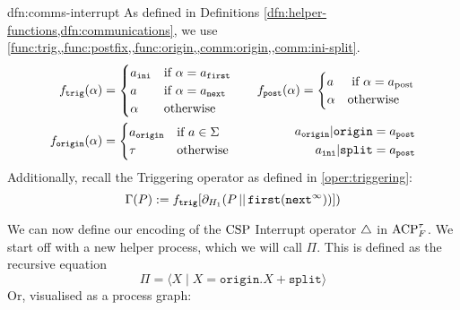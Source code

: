 \documentclass[../hons_project.tex]{subfiles}
\begin{document}
\begin{dfn}{dfn:comms-interrupt}{}
	As defined in Definitions \cref{dfn:helper-functions,dfn:communications}, we use \cref{func:trig,,func:postfix,,func:origin,,comm:origin,,comm:ini-split}.
	\begin{align*}
		f_{\mathtt{trig}}(\alpha) & = \begin{cases}
			                              a_{\mathtt{ini}} & \text{if } \alpha = a_{\mathtt{first}} \\
			                              a                & \text{if } \alpha = a_{\mathtt{next}}  \\
			                              \alpha           & \text{otherwise}
		                              \end{cases} \quad
		                          & f_{\mathtt{post}}(\alpha) = \begin{cases}
			                                                        a      & \text{ if } \alpha = a_{\mathrm{post}} \\
			                                                        \alpha & \text{otherwise}
		                                                        \end{cases}                                     \\
		\fdef{origin}(\alpha)     & = \begin{cases}
			                              a_{\mathtt{origin}} & \text{if } a\in\Sigma \\
			                              \tau                & \text{otherwise}
		                              \end{cases}                         & \begin{split}
			                                                                    a_{\mathtt{origin}} | \mathtt{origin}  = a_{\mathtt{post}} & \\
			                                                                    a_{\mathtt{ini}} | \mathtt{split} = a_{\mathtt{post}}      &
		                                                                    \end{split}
	\end{align*}
	Additionally, recall the Triggering operator as defined in \ref{oper:triggering}:
	\[\Gamma(P) := f_{\mathtt{trig}}[\partial_{H_{1}}(P \merge \mathtt{first}(\mathtt{next}^{\infty}))])\]
\end{dfn}

We can now define our encoding of the $\csp$ Interrupt operator $\interrupt$ in $\acptf$. We start off with a new helper process, which we will call $\Pi$. This is defined as the recursive equation
\[\Pi = \langle X \mid X = \mathtt{origin}.X + \mathtt{split} \rangle\]
Or, visualised as a process graph:
\[\]
\end{document}
